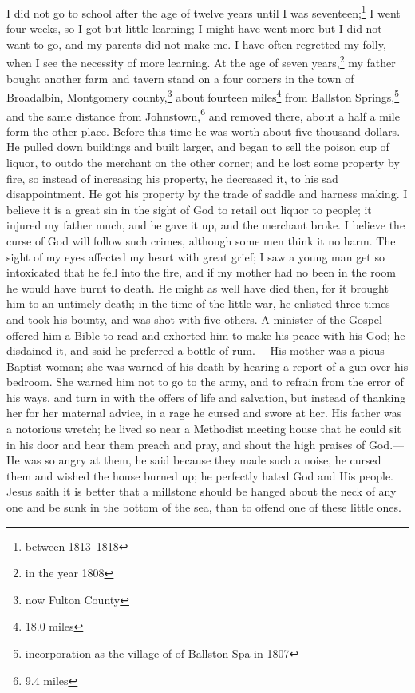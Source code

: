 I did not go to school after the age of twelve years until I was seventeen;\footnote{between 1813--1818} I went four weeks, so I got but little learning; I might have went more but I did not want to go, and my parents did not make me.
I have often regretted my folly, when I see the necessity of more learning.
At the age of seven years,\footnote{in the year 1808} my father bought another farm and tavern stand on a four corners in the town of Broadalbin, Montgomery county,\footnote{now Fulton County} about fourteen miles\footnote{18.0 miles} from Ballston Springs,\footnote{incorporation as the village of of Ballston Spa in 1807} and the same distance from Johnstown,\footnote{9.4 miles} and removed there, about a half a mile form the other place.
Before this time he was worth about five thousand dollars.
He pulled down buildings and built larger, and began to sell the poison cup of liquor, to outdo the merchant on the other corner; and he lost some property by fire, so instead of increasing his property, he decreased it, to his sad disappointment.
He got his property by the trade of saddle and harness making.
I believe it is a great sin in the sight of God to retail out liquor to people; it injured my father much, and he gave it up, and the merchant broke.
I believe the curse of God will follow such crimes, although some men think it no harm.
The sight of my eyes affected my heart with great grief; I saw a young man get so intoxicated that he fell into the fire, and if my mother had no been in the room he would have burnt to death.
He might as well have died then, for it brought him to an untimely death; in the time of the little war, he enlisted three times and took his bounty, and was shot with five others.
A minister of the Gospel offered him a Bible to read and exhorted him to make his peace with his God; he disdained it, and said he preferred a bottle of rum.---
His mother was a pious Baptist woman; she was warned of his death by hearing a report of a gun over his bedroom.
She warned him not to go to the army, and to refrain from the error of his ways, and turn in with the offers of life and salvation, but instead of thanking her for her maternal advice, in a rage he cursed and swore at her.
His father was a notorious wretch; he lived so near a Methodist meeting house that he could sit in his door and hear them preach and pray, and shout the high praises of God.---
He was so angry at them, he said because they made such a noise, he cursed them and wished the house burned up; he perfectly hated God and His people.
Jesus saith it is better that a millstone should be hanged about the neck of any one and be sunk in the bottom of the sea, than to offend one of these little ones.
